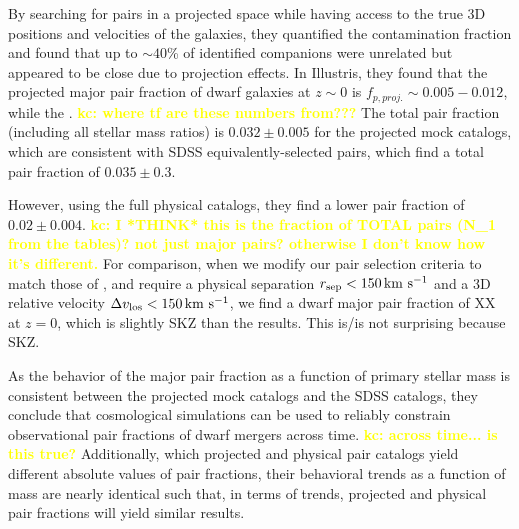 \documentclass[twocolumn]{aastex631}
\newcommand{\kc}[1]{\textcolor{yellow}{\textbf{kc: #1}} }
\begin{document}
By searching for pairs in a projected space while having access to the true 3D positions and velocities of the galaxies, they quantified the contamination fraction and found that up to $\sim40$\% of identified companions were unrelated but appeared to be close due to projection effects. 
In Illustris, they found that the projected major pair fraction of dwarf galaxies at $z\sim0$ is $f_{p,proj.}\sim0.005-0.012$, while the . \kc{where tf are these numbers from??? }
The total pair fraction (including all stellar mass ratios) is $0.032\pm0.005$ for the projected mock catalogs, which are consistent with SDSS equivalently-selected pairs, which find a total pair fraction of $0.035\pm0.3$. 

However, using the full physical catalogs, they find a lower pair fraction of $0.02\pm0.004$. \kc{I *THINK* this is the fraction of TOTAL pairs (N\_1 from the tables)? not just major pairs? otherwise I don't know how it's different.}
For comparison, when we modify our pair selection criteria to match those of \citet{Besla2018}, and require a physical separation $r_{\rm sep}< 150\,\mathrm{km}~\mathrm{s}^{-1}$ and a 3D relative velocity $\Delta v_{\rm los} < 150\,\mathrm{km}~\mathrm{s}^{-1}$, we find a dwarf major pair fraction of XX at $z=0$, which is slightly SKZ than the \citet{Besla2018} results.
This is/is not surprising because SKZ. 

As the behavior of the major pair fraction as a function of primary stellar mass is consistent between the projected mock catalogs and the SDSS catalogs, they conclude that cosmological simulations can be used to reliably constrain observational pair fractions of dwarf mergers across time. \kc{across time... is this true?} 
Additionally, which projected and physical pair catalogs yield different absolute values of pair fractions, their behavioral trends as a function of mass are nearly identical such that, in terms of trends, projected and physical pair fractions will yield similar results. 


\end{document}
